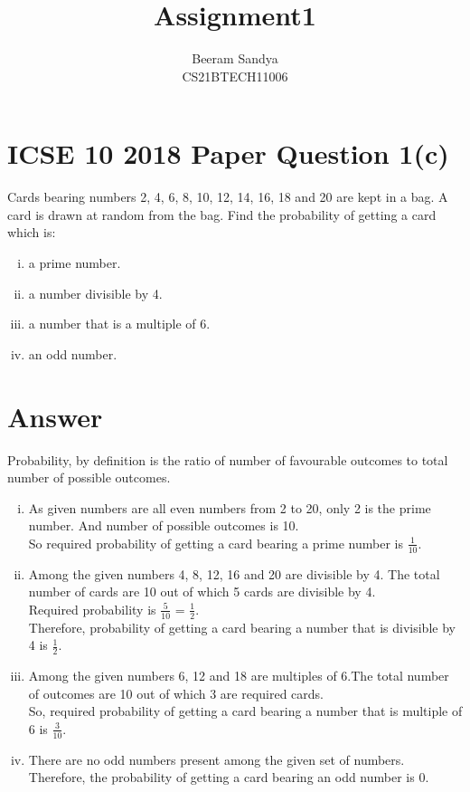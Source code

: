 \documentclass[journal,12pt,twocolumn]{IEEEtran}
\begin{document}
\title{Assignment1}
\author{\Large Beeram Sandya\\CS21BTECH11006}
\maketitle

\section{ICSE 10 2018 Paper Question 1(c)}
 Cards bearing numbers 2, 4, 6, 8, 10, 12, 14, 16, 18 and 20 are kept in a bag. A card is drawn at random from the bag. Find the probability of getting a card which is:\\ 
\begin{enumerate}[(i)]
\item a prime number.
\item a number divisible by 4.
\item a number that is a multiple of 6.
\item an odd number.
\end{enumerate}
\section{Answer}
 Probability, by definition is the ratio of number of favourable outcomes to total number of possible outcomes.\\
 \begin{enumerate}[(i)]
\item As given numbers are all even numbers from 2 to 20, only 2 is the prime number. And number of possible outcomes is 10.\\
So required probability of getting a card bearing a prime number is \( \frac{1}{10} \).\\
\item Among the given numbers 4, 8, 12, 16 and 20 are divisible by 4. The total number of cards are 10 out of which 5 cards are divisible by 4.\\
Required probability is \( \frac{5}{10} \) = \( \frac{1}{2} \).
\\Therefore, probability of getting a card bearing a number that is divisible by 4 is \(\frac{1}{2} \).\\
\item Among the given numbers 6, 12 and 18 are multiples of 6.The total number of outcomes are 10 out of which 3 are required cards.\\
So, required probability of getting a card bearing a number that is multiple of 6 is \(\frac{3}{10}\).\\
\item There are no odd numbers present among the given set of numbers.\\
Therefore, the probability of getting a card bearing an odd number is  0.\\
\end{enumerate}
\end{document}
